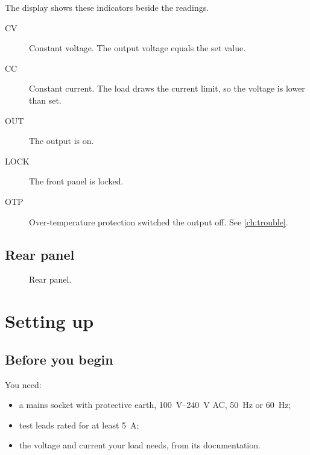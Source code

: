 \documentclass[type=manual, lang=en-GB, otherlangs={zh-HK}]{plaindoc}
\begin{document}
The display shows these indicators beside the readings.

\begin{description}
\item[CV] Constant voltage. The output voltage equals the set value.
\item[CC] Constant current. The load draws the current limit, so the voltage is lower than set.
\item[OUT] The output is on.
\item[LOCK] The front panel is locked.
\item[OTP] Over-temperature protection switched the output off. See \cref{ch:trouble}.
\end{description}

\section{Rear panel}

\begin{figure}[h]
\pdwide{\centering\dprear}
\caption{Rear panel.}
\label{fig:rear}
\end{figure}

\begin{pdlegend}
\end{pdlegend}

\chapter{Setting up}

\section{Before you begin}

You need:
\begin{itemize}
\item a mains socket with protective earth, \qtyrange{100}{240}{\volt} AC, \qty{50}{\Hz} or \qty{60}{\Hz};
\item test leads rated for at least \qty{5}{\ampere};
\item the voltage and current your load needs, from its documentation.
\end{itemize}
\end{document}
